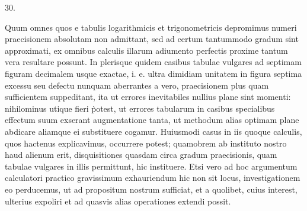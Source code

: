 \begin{center}
30.
\end{center}
Quum omnes quos e tabulis logarithmicis et trigonometricis depromimus numeri praecisionem absolutam non admittant, sed ad certum tantummodo gradum sint approximati, ex omnibus calculis illarum adiumento perfectis proxime tantum vera resultare possunt. In plerisque quidem casibus tabulae vulgares ad septimam figuram decimalem usque exactae, i. e. ultra dimidiam unitatem in figura septima excessu seu defectu nunquam aberrantes a vero, praecisionem plus quam sufficientem suppeditant, ita ut errores inevitabiles nullius plane sint momenti: nihilominus utique fieri \`{p}otest, ut errores tabularum in casibus specialibus effectum suum exserant augmentatione tanta, ut methodum alias optimam plane abdicare aliamque ei substituere cogamur. Huiusmodi casus in iis quoque calculis, quos hactenus explicavimus, occurrere potest; quamobrem ab instituto nostro haud alienum erit, disquisitiones quasdam circa gradum praecisionis, quam tabulae vulgares in illis permittunt, hic instituere. Etsi vero ad hoc argumentum calculatori practico gravissimum exhauriendum hic non sit locus, investigationem eo perducemus, ut ad propositum nostrum sufficiat, et a quolibet, cuius interest, ulterius expoliri et ad quasvis alias operationes extendi possit.

